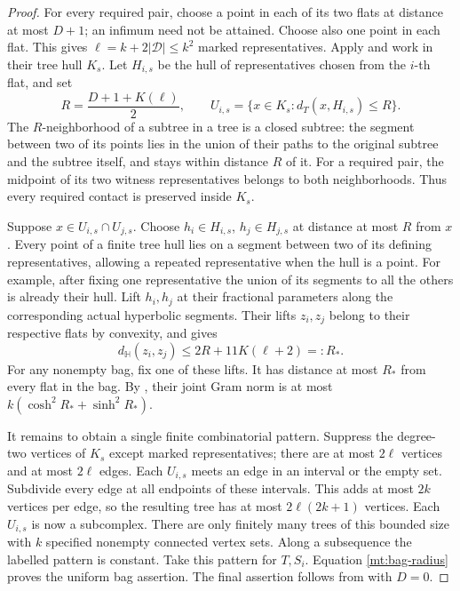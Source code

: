 \begin{proof}
For every required pair, choose a point in each of its two flats at
distance at most \(D+1\); an infimum need not be attained.  Choose
also one point in each flat.  This gives
\(\ell=k+2|\mathcal D|\le k^2\) marked representatives.  Apply
 and work in their tree hull \(K_s\).
Let \(H_{i,s}\) be the hull of representatives chosen from the
\(i\)-th flat, and set
\[
 R=\frac{D+1+K(\ell)}2,\qquad
 U_{i,s}=\{x\in K_s:d_T(x,H_{i,s})\le R\}.
\]
The \(R\)-neighborhood of a subtree in a tree is a closed subtree: the
segment between two of its points lies in the union of their paths
to the original subtree and the subtree itself, and stays within
distance \(R\) of it.
For a required pair, the midpoint of its two witness representatives
belongs to both neighborhoods.  Thus every required contact is
preserved inside \(K_s\).

Suppose \(x\in U_{i,s}\cap U_{j,s}\).  Choose
\(h_i\in H_{i,s}\), \(h_j\in H_{j,s}\) at distance at most \(R\)
from \(x\).  Every point of a finite tree hull lies on a segment
between two of its defining representatives, allowing a repeated
representative when the hull is a point.  For example, after fixing
one representative the union of its segments to all the others is
already their hull.  Lift \(h_i,h_j\) at their fractional parameters
along the corresponding actual hyperbolic segments.  Their lifts
\(z_i,z_j\) belong to their respective flats by convexity, and
 gives
\begin{equation}\label{mt:bag-radius}
 d_{\mathbb H}(z_i,z_j)\le 2R+11K(\ell+2)=:R_*.
\end{equation}
For any nonempty bag, fix one of these lifts.  It has distance at
most \(R_*\) from every flat in the bag.  By
, their joint Gram norm is at most
\(k(\cosh^2R_*+\sinh^2R_*)\).

It remains to obtain a single finite combinatorial pattern.  Suppress
the degree-two vertices of \(K_s\) except marked representatives;
there are at most \(2\ell\) vertices and at most \(2\ell\) edges.
Each \(U_{i,s}\) meets an edge in an interval or the empty set.
Subdivide every edge at all endpoints of these intervals.  This
adds at most \(2k\) vertices per edge, so the resulting tree has at
most \(2\ell(2k+1)\) vertices.  Each \(U_{i,s}\) is now a subcomplex.
There are only finitely many trees of this bounded size with \(k\)
specified nonempty connected vertex sets.  Along a subsequence the
labelled pattern is constant.  Take this pattern for \(T,S_i\).
Equation \eqref{mt:bag-radius} proves the uniform bag assertion.
The final assertion follows from  with
\(D=0\).
\end{proof}

